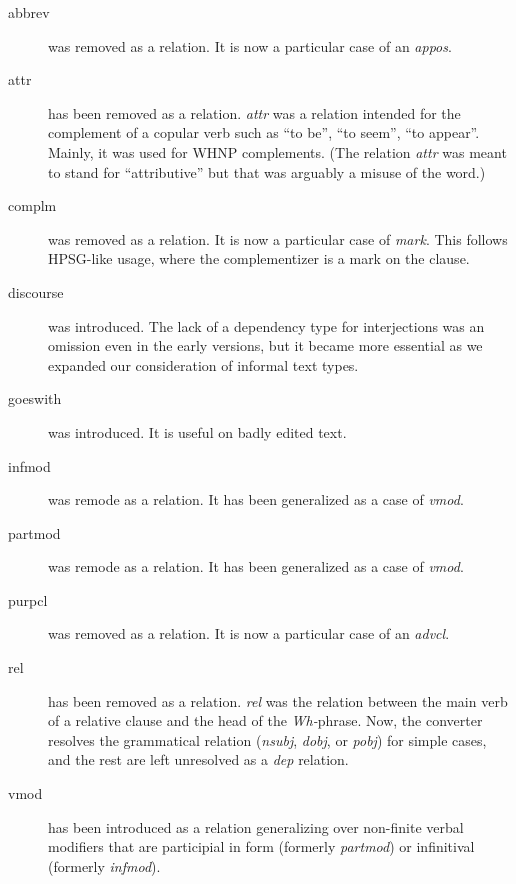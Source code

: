 \documentclass[11pt,letterpaper]{article}
\begin{document}
\begin{description}
\item[abbrev] was removed as a relation.  It is now a particular case
  of an \emph{appos}.
\item[attr] has been removed as a relation. \emph{attr} was a relation intended
for the complement of a copular verb such as ``to be'', ``to seem'', ``to appear''.
Mainly, it was used for WHNP complements.  (The relation \emph{attr}
was meant to stand for ``attributive'' but that was arguably a misuse
of the word.)
\item[complm] was removed as a relation. It is now a particular case of
  \emph{mark}. This follows HPSG-like usage, where the complementizer
  is a mark on the clause.
\item[discourse] was introduced. The lack of a dependency type for
  interjections was an omission even in the early versions, but it
  became more essential as we expanded our consideration of informal
  text types.
\item[goeswith] was introduced. It is useful on badly edited text.
\item[infmod] was remode as a relation. It has been generalized as a
  case of \emph{vmod}.
\item[partmod] was remode as a relation. It has been generalized as a
  case of \emph{vmod}.
\item[purpcl] was removed as a relation. It is now a particular case
  of an \emph{advcl}.
\item[rel] has been removed as a relation. \emph{rel} was the relation
  between the main verb of a relative clause and the head of the
  \emph{Wh-}phrase. Now, the converter resolves the grammatical
  relation (\emph{nsubj}, \emph{dobj}, or \emph{pobj}) for simple
  cases, and the rest are left unresolved as a \emph{dep} relation.
\item[vmod] has been introduced as a relation generalizing over
  non-finite verbal modifiers that are participial in form (formerly
  \emph{partmod}) or infinitival (formerly \emph{infmod}).
\end{description}




\end{document}
